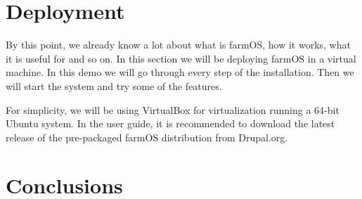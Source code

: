 \section{Deployment}
By this point, we already know a lot about what is farmOS, how it works, what it is useful for and so on. In this section we will be deploying farmOS in a virtual machine. In this demo we will go through every step of the installation. Then we will start the system and try some of the features.

For simplicity, we will be using VirtualBox for virtualization running a 64-bit Ubuntu system. In the user guide, it is recommended to download the latest release of the pre-packaged farmOS distribution from Drupal.org.

\section{Conclusions}
